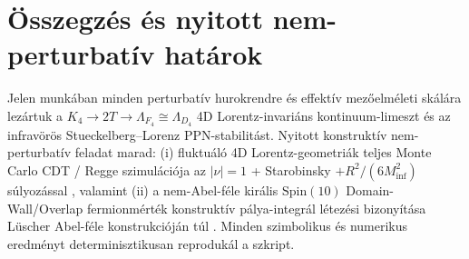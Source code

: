 \documentclass[11pt,a4paper]{article}
\begin{document}
\section{Összegzés és nyitott nem-perturbatív határok}
\label{sec:discussion}

Jelen munkában minden perturbatív hurokrendre és effektív mezőelméleti skálára lezártuk a $K_4 \to 2T \to \Lambda_{F_4} \cong \Lambda_{D_4}$ 4D Lorentz-invariáns kontinuum-limeszt és az infravörös Stueckelberg--Lorenz PPN-stabilitást. Nyitott konstruktív nem-perturbatív feladat marad: (i) fluktuáló 4D Lorentz-geometriák teljes Monte Carlo CDT / Regge szimulációja az $|\nu|=1$ + Starobinsky $+R^2/(6 M_{\mathrm{inf}}^2)$ súlyozással \cite{AmbjornJurkiewiczLoll2004}, valamint (ii) a nem-Abel-féle királis $\mathrm{Spin}(10)$ Domain-Wall/Overlap fermionmérték konstruktív pálya-integrál létezési bizonyítása Lüscher Abel-féle konstrukcióján túl \cite{Luscher1998}. Minden szimbolikus és numerikus eredményt determinisztikusan reprodukál a  szkript.
\end{document}
